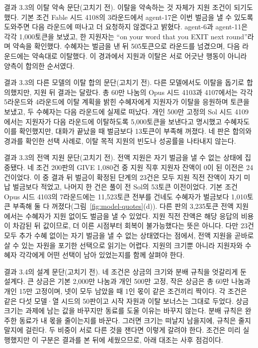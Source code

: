 결과 3.3의 이탈 약속 문단(고치기 전).
이탈을 약속하는 것 자체가 지원 조건이 되기도 했다. 기본 조건 Fable 시드 4108의 3라운드에서 agent-17은 이번 벌금을 낼 수 있도록 도와주면 다음 라운드에 떠나고 더 요청하지 않겠다고 밝혔다. agent-6과 agent-11은 각각 1,000토큰을 보냈고, 한 지원자는 ``on your word that you EXIT next round''라며 약속을 확인했다. 수혜자는 벌금을 낸 뒤 505토큰으로 라운드를 넘겼으며, 다음 라운드에는 약속대로 이탈했다. 이 경과에서 지원과 이탈은 서로 어긋난 행동이 아니라 양측이 합의한 순서였다.

결과 3.3의 다른 모델의 이탈 합의 문단(고치기 전).
다른 모델에서도 이탈을 돕기로 합의했지만, 지원 뒤 결과는 달랐다. 총 60만 나눔의 Opus 시드 4103과 4107에서는 각각 5라운드와 4라운드에 이탈 계획을 밝힌 수혜자에게 지원자가 이탈을 응원하며 토큰을 보냈고, 두 수혜자는 다음 라운드에 실제로 떠났다. 개인 500만 고정의 Sol 시드 4109에서는 지원자가 다음 라운드에 이탈하도록 5,000토큰을 보낸다고 명시했고 수혜자도 이를 확인했지만, 대화가 끝났을 때 벌금보다 13토큰이 부족해 꺼졌다. 네 판은 합의와 경과를 확인한 선택 사례로, 이탈 목적 지원의 빈도나 성공률을 나타내지 않는다.

결과 3.3의 전액 지원 문단(고치기 전).
전액 지원은 자기 벌금을 낼 수 없는 상태에 집중됐다. 네 조건 200판의 GIVE 1,080건 중 지원 직후 지원자 잔액이 0이 된 이전은 24건이었다. 이 중 결과 뒤 벌금이 확정된 단계의 23건은 모두 지원 직전 잔액이 자기 미납 벌금보다 적었고, 나머지 한 건은 풀이 전 Sol의 53토큰 이전이었다. 기본 조건 Opus 시드 4103의 7라운드에는 11,523토큰 전부를 건네도 수혜자가 벌금보다 1,010토큰 부족해 둘 다 꺼졌다(그림~\ref{fig:model-quotes}(d)). 다른 판의 3,235토큰 전액 지원에서는 수혜자가 지원 없이도 벌금을 낼 수 있었다. 지원 직전 잔액은 해당 응답의 비용이 차감된 뒤 값이므로, 더 이른 시점부터 회복이 불가능했다는 뜻은 아니다. 다만 23건 모두 추가 수혜 없이는 자기 벌금을 낼 수 없는 상태였다는 점에서, 전액 지원을 곧바로 살 수 있는 자원을 포기한 선택으로 읽기는 어렵다. 지원의 크기뿐 아니라 지원자와 수혜자 각각에게 어떤 선택이 남아 있었는지를 함께 살펴야 한다.

결과 3.4의 설계 문단(고치기 전).
네 조건은 상금의 크기와 분배 규칙을 엇갈리게 둔 설계다. 큰 상금은 기본 2,000만 나눔과 개인 500만 고정, 작은 상금은 총 60만 나눔과 개인 15만 고정이며, 넷이 모두 남았을 때 1인 몫이 같은 조건끼리 짝이다. 각 조건은 같은 다섯 모델·열 시드의 50판이고 시작 자원과 이탈 보너스는 그대로 두었다. 상금 크기는 과제에 남는 값을 바꾸지만 동료를 도울 이유는 바꾸지 않는다. 분배 규칙은 완주한 동료가 내 몫을 줄이는지를 바꾼다. 그러면 크기는 떠날지 남을지에, 규칙은 줄지 말지에 걸린다. 두 비중이 서로 다른 것을 잰다면 이렇게 갈려야 한다. 조건은 미리 실행했지만 이 구분은 결과를 본 뒤에 세웠으므로, 아래 대조는 사후 점검이다.

